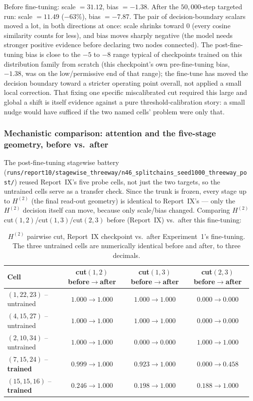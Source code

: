 \documentclass[11pt,a4paper]{article}
\begin{document}
Before fine-tuning: scale $=31.12$, bias $=-1.38$. After the $50{,}000$-step targeted run:
scale $=11.49$ ($-63\%$), bias $=-7.87$. The pair of decision-boundary scalars moved a lot, in
both directions at once: scale shrinks toward $0$ (every cosine similarity counts for less),
and bias moves sharply negative (the model needs stronger positive evidence before declaring
two nodes connected). The post-fine-tuning bias is close to the $-5$ to $-8$ range typical of
checkpoints trained on this distribution family from scratch (this checkpoint's own
pre-fine-tuning bias, $-1.38$, was on the low/permissive end of that range); the fine-tune has
moved the decision boundary toward a stricter operating point overall, not applied a small
local correction. That fixing one specific miscalibrated cut required this large and global a
shift is itself evidence against a pure threshold-calibration story: a small nudge would have
sufficed if the two named cells' problem were only that.

\subsubsection{Mechanistic comparison: attention and the five-stage geometry, before vs.\ after}
\label{sec:res-mechanistic}

The post-fine-tuning stagewise battery
(\texttt{runs/report10/stagewise\_threeway/n46\_splitchains\_seed1000\_threeway\_post/}) reused
Report~IX's five probe cells, not just the two targets, so the untrained cells serve as a
transfer check. Since the trunk is frozen, every stage up to $H^{(2)}$ (the final read-out
geometry) is identical to Report~IX's --- only the $H^{(2)}$ decision itself can move, because
only scale/bias changed. Comparing $H^{(2)}$ cut$(1,2)$/cut$(1,3)$/cut$(2,3)$ before
(Report~IX) vs.\ after this fine-tuning:

\begin{table}[H]
\centering\small
\begin{tabular}{lccc}
\toprule
Cell & cut$(1,2)$ before$\to$after & cut$(1,3)$ before$\to$after & cut$(2,3)$ before$\to$after \\
\midrule
$(1,22,23)$ -- untrained  & $1.000\to1.000$ & $1.000\to1.000$ & $0.000\to0.000$ \\
$(4,15,27)$ -- untrained  & $1.000\to1.000$ & $1.000\to1.000$ & $0.000\to0.000$ \\
$(2,10,34)$ -- untrained  & $1.000\to1.000$ & $0.000\to0.000$ & $1.000\to1.000$ \\
$(7,15,24)$ -- \textbf{trained} & $0.999\to1.000$ & $0.923\to1.000$ & $0.000\to0.458$ \\
$(15,15,16)$ -- \textbf{trained} & $0.246\to1.000$ & $0.198\to1.000$ & $0.188\to1.000$ \\
\bottomrule
\end{tabular}
\caption{$H^{(2)}$ pairwise cut, Report~IX checkpoint vs.\ after Experiment~1's fine-tuning. The
three untrained cells are numerically identical before and after, to three decimals.}
\label{tab:r10stagewise}
\end{table}
\end{document}
